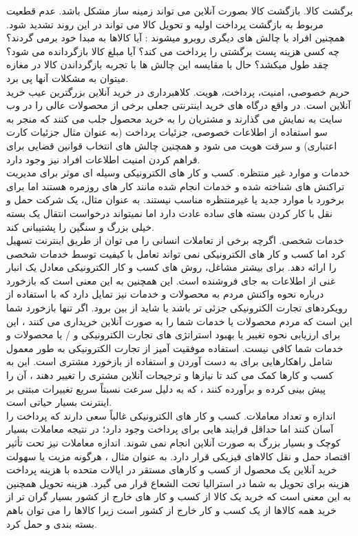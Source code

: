 \documentclass[14pt]{article}
\begin{document}
برگشت کالا. بازگشت کالا بصورت آنلاین می تواند زمینه ساز مشکل باشد. عدم قطعیت مربوط به بازگشت پرداخت اولیه و تحویل کالا می تواند در این روند تشدید شود. همچنین افراد با چالش های دیگری روبرو میشوند : آیا کالاها به مبدا خود برمی گردند؟ چه کسی هزینه پست برگشتی را پرداخت می کند؟ آیا مبلغ کالا بازگردانده می شود؟ چقد طول میکشد؟ حال با مقایسه این چالش ها با تجربه بازگرداندن کالا در مغازه میتوان به مشکلات آنها پی برد.\\
حریم خصوصی، امنیت، پرداخت، هویت. کلاهبرداری در خرید آنلاین بزرگترین عیب خرید آنلاین است. در واقع درگاه های خرید اینترنتی جعلی برخی از محصولات عالی را در وب سایت به نمایش می گذارند و مشتریان را به خرید محصول جلب می کنند که منجر به سو استفاده از اطلاعات خصوصی، جزئیات پرداخت (به عنوان مثال جزئیات کارت اعتباری) و سرقت هویت می شود و همچنین چالش های انتخاب قوانین قضایی برای فراهم کردن امنیت اطلاعات افراد نیز وجود دارد. \\
خدمات و موارد غیر منتظره. کسب و کار های الکترونیکی وسیله ای موثر برای مدیریت تراکنش های شناخته شده و خدمات انجام شده مانند کار های روزمره هستند اما برای برخورد با موارد جدید یا غیرمنتظره مناسب نیستند. به عنوان مثال، یک شرکت حمل و نقل با کار کردن بسته های ساده عادت دارد اما نمیتواند درخواست انتقال یک بسته خیلی بزرگ و سنگین را پشتیبانی کند.\\
خدمات شخصی. اگرچه برخی از تعاملات انسانی را می توان از طریق اینترنت تسهیل کرد اما کسب و کار های الکترونیکی نمی تواند تعامل با کیفیت توسط خدمات شخصی را ارائه دهد. برای بیشتر مشاغل، روش های کسب و کار الکترونیکی معادل یک انبار غنی از اطلاعات به جای فروشنده است. این همچنین به این معنی است که بازخورد درباره نحوه واکنش مردم به محصولات و خدمات نیز تمایل دارد که با استفاده از رویکردهای تجارت الکترونیکی جزئی تر باشد یا شاید از بین برود. اگر تنها بازخورد شما این است که مردم محصولات یا خدمات شما را به صورت آنلاین خریداری می کنند ، این برای ارزیابی نحوه تغییر یا بهبود استراتژی های تجارت الکترونیکی و / یا محصولات و خدمات شما کافی نیست. استفاده موفقیت آمیز از تجارت الکترونیکی به طور معمول شامل راهکارهایی برای به دست آوردن و استفاده از بازخورد مشتری است. این به کسب و کارها کمک می کند تا نیازها و ترجیحات آنلاین مشتری را تغییر دهند ، آن را پیش بینی کرده و برآورده کنند ، که به دلیل سرعت نسبتاً سریع تغییرات مبتنی بر اینترنت بسیار حیاتی است.\\
اندازه و تعداد معاملات. کسب و کار های الکترونیکی غالباً سعی دارند که پرداخت را آسان کنند اما حداقل فرایند هایی برای پرداخت وجود دارد؛ در نتیجه معاملات بسیار کوچک و بسیار بزرگ به صورت آنلاین انجام نمی شوند. اندازه معاملات نیز تحت تأثیر اقتصاد حمل و نقل کالاهای فیزیکی قرار دارد. به عنوان مثال ، هرگونه مزیت یا سهولت خرید آنلاین یک محصول از کسب و کارهای مستقر در ایالات متحده با هزینه پرداخت هزینه برای تحویل به شما در استرالیا تحت الشعاع قرار می گیرد. هزینه تحویل همچنین به این معنی است که خرید یک کالا از کسب و کار های خارج از کشور بسیار گران تر از خرید همه کالاها از یک کسب و کار خارج از کشور است زیرا کالاها را می توان باهم بسته بندی و حمل کرد.\\
\end{document}
